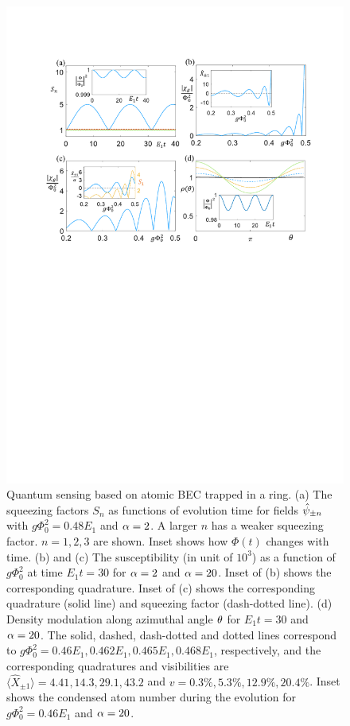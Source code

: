 \documentclass[twocolumn,prl,floatfix,citeautoscript,nofootinbib,superscriptaddress]{revtex4}
\begin{document}
\begin{widetext}
\begin{figure}[t]
\includegraphics[width=0.8\linewidth]{FigS2.pdf}
\caption{Quantum sensing based on atomic BEC trapped in a ring. (a) The
squeezing factors $S_{n}$ as functions of evolution time for fields $\hat{%
\protect\psi}_{\pm n}$ with $g\Phi _{0}^{2}=0.48E_{1}$ and $\protect\alpha %
=2 $. A larger $n$ has a weaker squeezing factor. $n=1,2,3$ are shown. Inset
shows how $\Phi (t)$ changes with time. (b) and (c) The susceptibility (in
unit of $10^{3}$) as a function of $g\Phi _{0}^{2}$ at time $E_{1}t=30$ for $%
\protect\alpha =2$ and $\protect\alpha =20$. Inset of (b) shows the
corresponding quadrature. Inset of (c) shows the corresponding quadrature
(solid line) and squeezing factor (dash-dotted line). (d) Density modulation
along azimuthal angle $\protect\theta $ for $E_{1}t=30$ and $\protect\alpha %
=20$. The solid, dashed, dash-dotted and dotted lines correspond to $g\Phi
_{0}^{2}=0.46E_{1},0.462E_{1},0.465E_{1},0.468E_{1}$, respectively, and the
corresponding quadratures and visibilities are $\langle \hat{X}_{\pm
1}\rangle =4.41,14.3,29.1,43.2$ and $v=0.3\%,5.3\%,12.9\%,20.4\%$. Inset
shows the condensed atom number during the evolution for $g\Phi
_{0}^{2}=0.46E_{1}$ and $\protect\alpha =20$.}
\label{fig:S2}
\end{figure}


\end{widetext}
\end{document}
